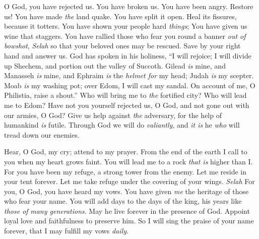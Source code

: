 \begin{biblechapter} %
 O God, you have rejected us. You have broken us. 
You have been angry. Restore us!
\verse You have made \textit{the} land quake. You have split it open. 
Heal its fissures, because it totters.
\verse You have shown your people hard \textit{things}; 
You have given us wine that staggers.
\verse You have rallied those who fear you round a banner 
\textit{out of bowshot}, \textit{Selah}
\verse so that your beloved ones may be rescued. 
Save by your right hand and answer us.
\verse God has spoken in his holiness, 
“I will rejoice; 
I will divide up Shechem, 
and portion out the valley of Succoth.
\verse Gilead \textit{is} mine, and Manasseh \textit{is} mine, 
and Ephraim \textit{is} the \textit{helmet for} my head; 
Judah \textit{is} my scepter.
\verse Moab \textit{is} my washing pot; 
over Edom, I will cast my sandal. 
On account of me, O Philistia, raise a shout.”
\verse Who will bring me to \textit{the} fortified city? 
Who will lead me to Edom?
\verse Have not you yourself rejected us, O God, 
and not gone out with our armies, O God?
\verse Give us help against \textit{the} adversary, 
for the help of humankind \textit{is} futile.
\verse Through God we will do \textit{valiantly}, 
and \textit{it is} he \textit{who} will tread down our enemies.
\end{biblechapter}

\begin{biblechapter} %
 Hear, O God, my cry; 
attend to my prayer.
\verse From the end of the earth I call to you 
when my heart grows faint. 
You will lead me to a rock \textit{that is} higher than I.
\verse For you have been my refuge, 
a strong tower from the enemy.
\verse Let me reside in your tent forever. 
Let me take refuge under the covering of your wings. \textit{Selah}
\verse For you, O God, you have heard my vows. 
You have given \textit{me} the heritage of those who fear your name.
\verse You will add days to the days of the king, 
his years like \textit{those of} \textit{many generations}.
\verse May he live forever in the presence of God. 
Appoint loyal love and faithfulness to preserve him.
\verse So I will sing the praise of your name forever, 
that I may fulfill my vows \textit{daily}.
\end{biblechapter}

